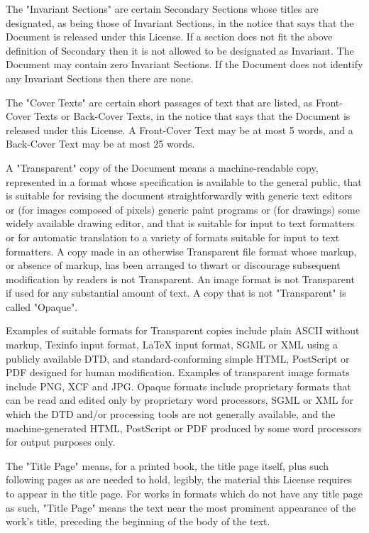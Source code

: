 {\begin{multicols}{4}
The "Invariant Sections" are certain Secondary Sections whose titles are designated, as being those of Invariant Sections, in the notice that says that the Document is released under this License. If a section does not fit the above definition of Secondary then it is not allowed to be designated as Invariant. The Document may contain zero Invariant Sections. If the Document does not identify any Invariant Sections then there are none.

The "Cover Texts" are certain short passages of text that are listed, as Front-Cover Texts or Back-Cover Texts, in the notice that says that the Document is released under this License. A Front-Cover Text may be at most 5 words, and a Back-Cover Text may be at most 25 words.

A "Transparent" copy of the Document means a machine-readable copy, represented in a format whose specification is available to the general public, that is suitable for revising the document straightforwardly with generic text editors or (for images composed of pixels) generic paint programs or (for drawings) some widely available drawing editor, and that is suitable for input to text formatters or for automatic translation to a variety of formats suitable for input to text formatters. A copy made in an otherwise Transparent file format whose markup, or absence of markup, has been arranged to thwart or discourage subsequent modification by readers is not Transparent. An image format is not Transparent if used for any substantial amount of text. A copy that is not "Transparent" is called "Opaque".

Examples of suitable formats for Transparent copies include plain ASCII without markup, Texinfo input format, LaTeX input format, SGML or XML using a publicly available DTD, and standard-conforming simple HTML, PostScript or PDF designed for human modification. Examples of transparent image formats include PNG, XCF and JPG. Opaque formats include proprietary formats that can be read and edited only by proprietary word processors, SGML or XML for which the DTD and/or processing tools are not generally available, and the machine-generated HTML, PostScript or PDF produced by some word processors for output purposes only.

The "Title Page" means, for a printed book, the title page itself, plus such following pages as are needed to hold, legibly, the material this License requires to appear in the title page. For works in formats which do not have any title page as such, "Title Page" means the text near the most prominent appearance of the work's title, preceding the beginning of the body of the text.


\end{multicols}}

